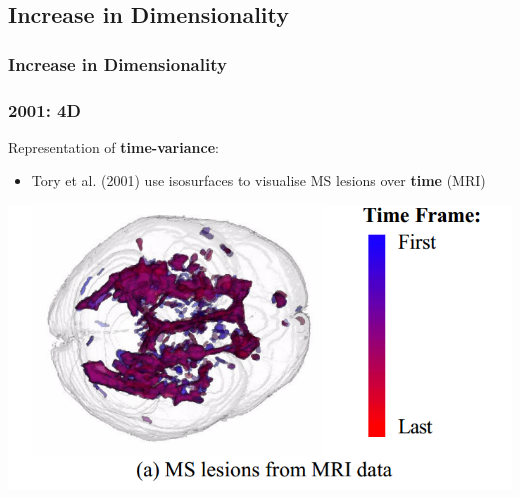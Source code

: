 \documentclass{beamer}
\begin{document}
\subsection{Increase in Dimensionality}
\begin{frame}
	\frametitle{Increase in Dimensionality}
\end{frame}


\begin{frame}
	\frametitle{2001: 4D}
	Representation of \textbf{time-variance}:
	\begin{itemize}
		\item Tory et al. (2001) use isosurfaces to visualise MS lesions over
			\textbf{time} (MRI)
	\end{itemize}
	\begin{center}
		\includegraphics[width=.8\textwidth]{images/ms_time}
	\end{center}
\end{frame}
\end{document}
